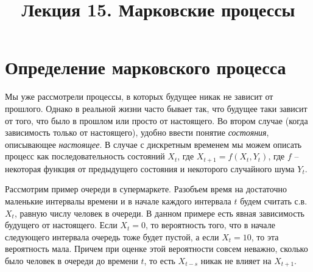 \documentclass[12pt]{article}
\title{Лекция 15. Марковские процессы}
\begin{document}
\maketitle

\section{Определение марковского процесса}

Мы уже рассмотрели процессы, в которых будущее никак не зависит от прошлого. Однако в реальной жизни часто бывает так, что будущее таки зависит от того, что было в прошлом или просто от настоящего. Во втором случае (когда зависимость только от настоящего), удобно ввести понятие \emph{состояния}, описывающее \emph{настоящее}. В случае с дискретным временем мы можем описать процесс как последовательность состояний $X_t$, где $X_{t + 1} = f(X_t, Y_t)$, где $f$ -- некоторая функция от предыдущего состояния и некоторого случайного шума $Y_t$. 

Рассмотрим пример очереди в супермаркете. Разобъем время на достаточно маленькие интервалы времени и в начале каждого интервала $t$ будем считать с.в. $X_t$, равную числу человек в очереди. В данном примере есть явная зависимость будущего от настоящего. Если $X_t = 0$, то вероятность того, что в начале следующего интервала очередь тоже будет пустой, а если $X_t = 10$, то эта вероятность мала. Причем при оценке этой вероятности совсем неважно, сколько было человек в очереди до времени $t$, то есть $X_{t - s}$ никак не влияет на $X_{t + 1}$.
\end{document}
